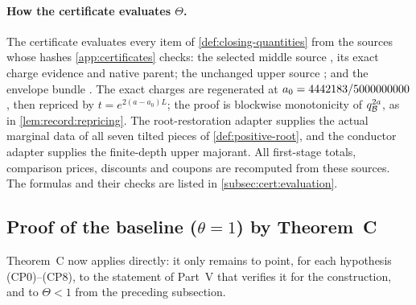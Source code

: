 \paragraph{How the certificate evaluates $\Theta$.}
The certificate evaluates every item of \cref{def:closing-quantities} from the sources whose hashes \cref{app:certificates} checks: the selected middle source
, its exact
charge evidence and native parent; the unchanged upper source
; and the
envelope bundle
.
The exact charges are regenerated at $a_0=4442183/5000000000$, then repriced by
$t=e^{2(a-a_0)L}$; the proof is blockwise monotonicity of
$q_\mathcal B^{2a}$, as in \cref{lem:record:repricing}.
The root-restoration adapter supplies the actual marginal data of all seven tilted pieces of \cref{def:positive-root}, and the conductor adapter supplies the finite-depth upper
majorant. All first-stage totals, comparison prices, discounts and coupons
are recomputed from these sources. The formulas and their checks are listed
in \cref{subsec:cert:evaluation}.

\subsection{Proof of the baseline (\texorpdfstring{$\theta=1$}{theta=1}) by Theorem~C}\label{subsec:proof-main}

Theorem~C now applies directly: it only remains to point, for each
hypothesis (CP0)--(CP8), to the statement of Part~V that verifies
it for the construction, and to $\Theta<1$ from the preceding
subsection.


